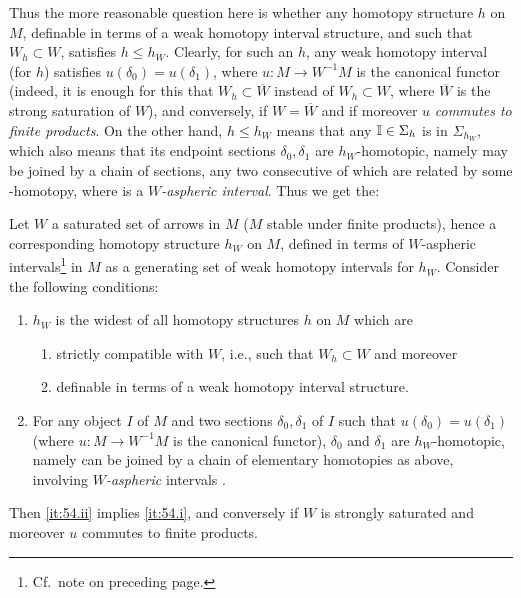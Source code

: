 Thus the more reasonable question here is whether any homotopy
structure $h$ on $M$, definable in terms of a weak homotopy interval
structure, and such that $W_h\subset W$, satisfies $h\le
h_W$. Clearly, for such an $h$, any weak homotopy interval \bI{} (for
$h$) satisfies $u(\delta_0)=u(\delta_1)$, where $u:M\to W^{-1}M$ is
the canonical functor (indeed, it is enough for this that
$W_h\subset\overline W$ instead of $W_h\subset W$, where $\overline W$
is the strong saturation of $W$), and conversely, if $W=\overline W$
and if moreover $u$ \emph{commutes to finite products}. On the other
hand, $h\le h_W$ means that any ${\mathbb{I}}\in\Sigma_h$ is in $\Sigma_{h_W}$,
which also means that its endpoint sections $\delta_0,\delta_1$ are
$h_W$-homotopic, namely may be joined by a chain of sections, any two
consecutive of which are related by some \bJ-homotopy, where \bJ{} is
a \emph{$W$-aspheric interval}. Thus we get the:
\begin{proposition}
  Let $W$ a saturated set of arrows in $M$ \textup($M$ stable under
  finite products\textup), hence a corresponding homotopy structure
  $h_W$ on $M$, defined in terms of $W$-aspheric
  intervals\footnote{ Cf.\ note on preceding page.\label{fn:54.star}} in $M$ as a
  generating set of weak homotopy intervals for $h_W$. Consider the
  following conditions:
  \begin{enumerate}[label=(\roman*),font=\normalfont]
  \item\label{it:54.i}
    $h_W$ is the widest of all homotopy structures $h$ on $M$ which
    are
    \begin{enumerate}[label=(\alph*),font=\normalfont]
    \item\label{it:54.i.a} strictly compatible with $W$, i.e., such
      that $W_h\subset W$ and moreover
    \item\label{it:54.i.b}
      definable in terms of a weak homotopy interval structure.
    \end{enumerate}
  \item\label{it:54.ii}
    For any object $I$ of $M$ and two sections $\delta_0,\delta_1$ of
    $I$ such that $u(\delta_0)=u(\delta_1)$ \textup(where $u:M\to
    W^{-1}M$ is the canonical functor\textup), $\delta_0$ and
    $\delta_1$ are $h_W$-homotopic, namely can be joined by a chain of
    elementary homotopies as above, involving
    \emph{$W$-aspheric} intervals \bJ.
  \end{enumerate}
  Then \textup{\ref{it:54.ii}} implies \textup{\ref{it:54.i}}, and conversely if $W$ is
  strongly saturated and moreover $u$ commutes to finite products.
\end{proposition}

